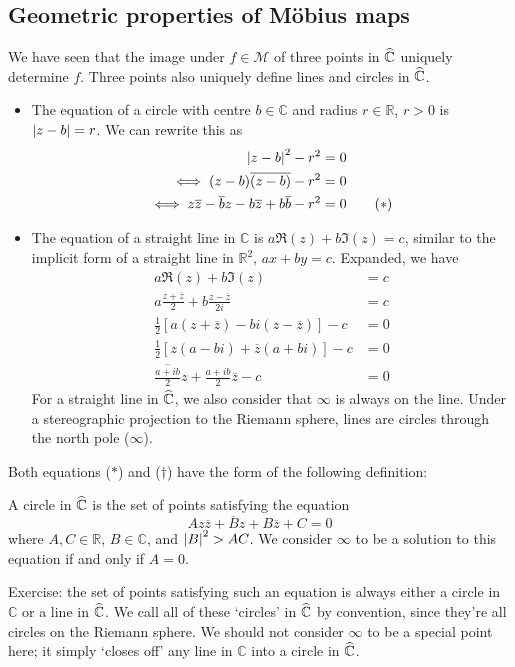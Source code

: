 \subsection{Geometric properties of M\"obius maps}
We have seen that the image under \(f \in \mathcal M\) of three points in \(\widehat{\mathbb C}\) uniquely determine \(f\).
Three points also uniquely define lines and circles in \(\widehat{\mathbb C}\).
\begin{itemize}
	\item The equation of a circle with centre \(b \in \mathbb C\) and radius \(r \in \mathbb R\), \(r > 0\) is \(\abs{z-b} = r\).
	      We can rewrite this as
	      \begin{align*}
		      \abs{z-b}^2 - r^2                                                        & = 0                \\
		      \iff (z-b)\overline{(z-b)} - r^2                                         & = 0                \\
		      \iff z\overline{z} - \overline{b}z - b\overline{z} + b\overline{b} - r^2 & = 0 \tag{\(\ast\)}
	      \end{align*}
	\item The equation of a straight line in \(\mathbb C\) is \(a \Re(z) + b \Im(z) = c\), similar to the implicit form of a straight line in \(\mathbb R^2\), \(ax+by=c\).
	      Expanded, we have
	      \begin{align*}
		      a \Re(z) + b \Im(z)                                                      & = c                   \\
		      a \frac{z + \overline z}{2} + b \frac{z - \overline z}{2i}               & = c                   \\
		      \frac{1}{2}\left[ a (z + \overline z) - bi (z - \overline z) \right] - c & = 0                   \\
		      \frac{1}{2}\left[ z(a-bi) + \overline z(a+bi) \right] - c                & = 0                   \\
		      \overline{\frac{a + ib}{2}}z + \frac{a+ib}{2}\overline{z} - c            & = 0 \tag{\(\dagger\)}
	      \end{align*}
	      For a straight line in \(\widehat{\mathbb C}\), we also consider that \(\infty\) is always on the line.
	      Under a stereographic projection to the Riemann sphere, lines are circles through the north pole (\(\infty\)).
\end{itemize}
Both equations (\(\ast\)) and (\(\dagger\)) have the form of the following definition:
\begin{definition}
	A circle in \(\widehat{\mathbb C}\) is the set of points satisfying the equation
	\[
		Az\overline z + \overline B z + B \overline z + C = 0
	\]
	where \(A, C \in \mathbb R\), \(B \in \mathbb C\), and \(\abs{B}^2 > AC\).
	We consider \(\infty\) to be a solution to this equation if and only if \(A = 0\).
\end{definition}
Exercise: the set of points satisfying such an equation is always either a circle in \(\mathbb C\) or a line in \(\widehat{\mathbb C}\).
We call all of these `circles' in \(\widehat{\mathbb C}\) by convention, since they're all circles on the Riemann sphere.
We should not consider \(\infty\) to be a special point here; it simply `closes off' any line in \(\mathbb C\) into a circle in \(\widehat{\mathbb C}\).

